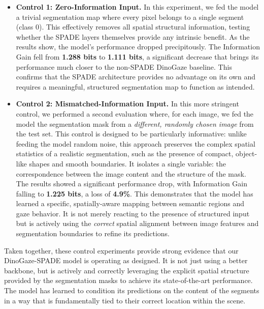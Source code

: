 \begin{itemize}
    \item \textbf{Control 1: Zero-Information Input.} In this experiment, we fed the model a trivial segmentation map where every pixel belongs to a single segment (class 0). This effectively removes all spatial structural information, testing whether the SPADE layers themselves provide any intrinsic benefit. As the results show, the model's performance dropped precipitously. The Information Gain fell from \textbf{1.288 bits} to \textbf{1.111 bits}, a significant decrease that brings its performance much closer to the non-SPADE DinoGaze baseline. This confirms that the SPADE architecture provides no advantage on its own and requires a meaningful, structured segmentation map to function as intended.

    \item \textbf{Control 2: Mismatched-Information Input.} In this more stringent control, we performed a second evaluation where, for each image, we fed the model the segmentation mask from a \textit{different, randomly chosen image} from the test set. This control is designed to be particularly informative: unlike feeding the model random noise, this approach preserves the complex spatial statistics of a realistic segmentation, such as the presence of compact, object-like shapes and smooth boundaries. It isolates a single variable: the correspondence between the image content and the structure of the mask. The results showed a significant performance drop, with Information Gain falling to \textbf{1.225 bits}, a loss of \textbf{4.9\%}. This demonstrates that the model has learned a specific, spatially-aware mapping between semantic regions and gaze behavior. It is not merely reacting to the presence of structured input but is actively using the \textit{correct} spatial alignment between image features and segmentation boundaries to refine its predictions.

\end{itemize}

Taken together, these control experiments provide strong evidence that our DinoGaze-SPADE model is operating as designed. It is not just using a better backbone, but is actively and correctly leveraging the explicit spatial structure provided by the segmentation masks to achieve its state-of-the-art performance. The model has learned to condition its predictions on the content of the segments in a way that is fundamentally tied to their correct location within the scene.










